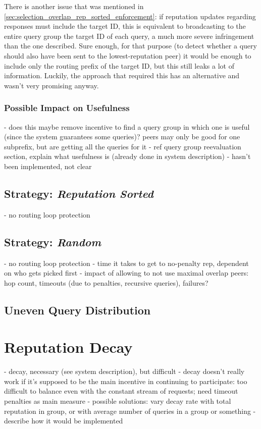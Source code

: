 There is another issue that was mentioned in
\ref{sec:selection_overlap_rep_sorted_enforcement}: if reputation updates
regarding responses must include the target ID, this is equivalent to
broadcasting to the entire query group the target ID of each query, a much more
severe infringement than the one described. Sure enough, for that purpose (to
detect whether a query should also have been sent to the lowest-reputation
peer) it would be enough to include only the routing prefix of the target ID,
but this still leaks a lot of information. Luckily, the approach that required
this has an alternative and wasn't very promising anyway.

\subsubsection{Possible Impact on Usefulness}
- does this maybe remove incentive to find a query group in which one is useful
  (since the system guarantees some queries)? peers may only be good for one
  subprefix, but are getting all the queries for it
- ref query group reevaluation section, explain what usefulness is (already done
  in system description)
- hasn't been implemented, not clear

\subsection{Strategy: \emph{Reputation Sorted}}
- no routing loop protection
\subsection{Strategy: \emph{Random}}
- no routing loop protection
- time it takes to get to no-penalty rep, dependent on who gets picked first
- impact of allowing to not use maximal overlap peers: hop count, timeouts (due
  to penalties, recursive queries), failures?
\subsection{Uneven Query Distribution}

\section{Reputation Decay}
- decay, necessary (see system description), but difficult
- decay doesn't really work if it's supposed to be the main incentive in
  continuing to participate: too difficult to balance even with the constant
  stream of requests; need timeout penalties as main measure
- possible solutions: vary decay rate with total reputation in group, or with
  average number of queries in a group or something
- describe how it would be implemented

